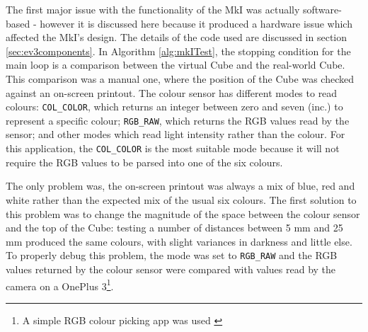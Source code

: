 \documentclass{report}
\begin{document}
	The first major issue with the functionality of the MkI was actually software-based - however it is discussed here because it produced a hardware issue which affected the MkI's design. The details of the code used are discussed in section \ref{sec:ev3components}. In Algorithm \ref{alg:mkITest}, the stopping condition for the main loop is a comparison between the virtual Cube and the real-world Cube. This comparison was a manual one, where the position of the Cube was checked against an on-screen printout. The colour sensor has different modes to read colours: \lstinline|COL_COLOR|, which returns an integer between zero and seven (inc.) to represent a specific colour; \lstinline|RGB_RAW|, which returns the RGB values read by the sensor; and other modes which read light intensity rather than the colour. For this application, the \lstinline|COL_COLOR| is the most suitable mode because it will not require the RGB values to be parsed into one of the six colours.
	
	The only problem was, the on-screen printout was always a mix of blue, red and white rather than the expected mix of the usual six colours. The first solution to this problem was to change the magnitude of the space between the colour sensor and the top of the Cube: testing a number of distances between 5 \si{\milli\metre} and 25 \si{\milli\metre} produced the same colours, with slight variances in darkness and little else. To properly debug this problem, the mode was set to \lstinline|RGB_RAW| and the RGB values returned by the colour sensor were compared with values read by the camera on a OnePlus 3\footnote{A simple RGB colour picking app was used \cite{RangoApps2015}}.
	
\end{document}
